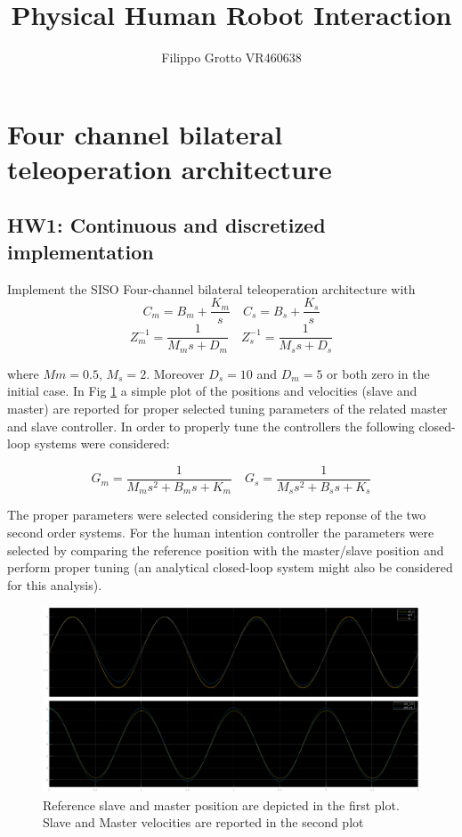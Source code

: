 \documentclass[a4paper,12pt]{article}
\begin{document}
\author{Filippo Grotto VR460638}

\title{Physical Human Robot Interaction}

\maketitle
\tableofcontents

\section{Four channel bilateral teleoperation architecture}

\subsection{HW1: Continuous and discretized implementation}
Implement the SISO Four-channel bilateral teleoperation architecture with
\[
    C_m = B_m + \frac{K_m}{s} \quad
    C_s = B_s + \frac{K_s}{s}
\]
\[
    Z_m^{-1} = \frac{1}{M_ms + D_m} \quad
    Z_s^{-1} = \frac{1}{M_ss + D_s}
\]

\bigskip
\noindent where $Mm = 0.5$, $M_s = 2$. Moreover $D_s = 10$ and $D_m = 5$ or both zero in the initial case. In Fig \ref{fig:hw1} a simple plot of the positions and velocities (slave and master) are reported for proper selected tuning parameters of the related master and slave controller. In order to properly tune the controllers the following closed-loop systems were considered:

\[
G_m = \frac{1}{M_ms^2+B_ms+K_m} \quad
G_s = \frac{1}{M_ss^2+B_ss+K_s}
\]

\bigskip
\noindent The proper parameters were selected considering the step reponse of the two second order systems. For the human intention controller the parameters were selected by comparing the reference position with the master/slave position and perform proper tuning (an analytical closed-loop system might also be considered for this analysis).

\begin{figure}[H]
    \begin{center}
        \hspace*{-2cm}
        \includegraphics[scale=0.39]{images/hw1.eps}
    \end{center}
    \caption{Reference slave and master position are depicted in the first plot. Slave and Master velocities are reported in the second plot}
    \label{fig:hw1}
\end{figure}
\end{document}
